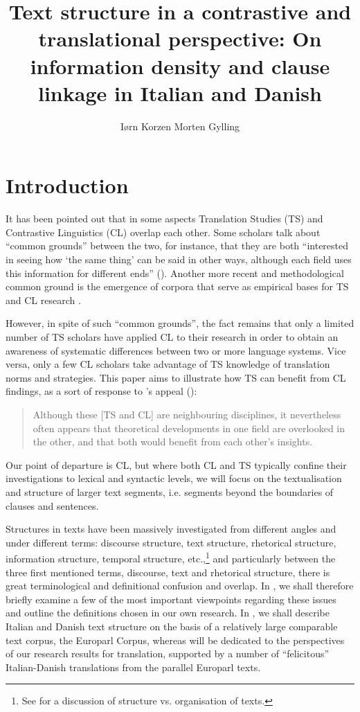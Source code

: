 \documentclass[output=paper]{LSP/langsci}
\author{Iørn Korzen\lastand 
Morten Gylling\affiliation{Copenhagen Business School} 
}
\title{Text structure in a contrastive and translational perspective: On information density and clause linkage in Italian and Danish}
\begin{document}
 

\section{Introduction}\label{sec:korzen:1}

It has been pointed out that in some aspects Translation Studies (TS) and Contrastive Linguistics (CL) overlap each other. Some scholars talk about ``common grounds'' between the two, for instance, that they are both ``interested in seeing how `the same thing' can be said in other ways, although each field uses this information for different ends'' (\citealt[39]{Chesterman1998}). Another more recent and methodological common ground is the emergence of corpora that serve as empirical bases for TS and CL research \citep{Granger2003}.

However, in spite of such ``common grounds'', the fact remains that only a limited number of TS scholars have applied CL to their research in order to obtain an awareness of systematic differences between two or more language systems. Vice versa, only a few CL scholars take advantage of TS knowledge of translation norms and strategies. This paper aims to illustrate how TS can benefit from CL findings, as a sort of response to \citeauthor{Chesterman1998}'s appeal (\citeyear[6]{Chesterman1998}):

\begin{quote} Although these [TS and CL] are neighbouring disciplines, it nevertheless often appears that theoretical developments in one field are overlooked in the other, and that both would benefit from each other's insights. 
\end{quote}

Our point of departure is CL, but where both CL and TS typically confine their investigations to lexical and syntactic levels, we will focus on the textualisation and structure of larger text segments, i.e. segments beyond the boundaries of clauses and sentences. 

Structures in texts have been massively investigated from different angles and under different terms: discourse structure, text structure, rhetorical structure, information structure, temporal structure, etc.,\footnote{See \citet{Hoey1991} for a discussion of structure vs. organisation of texts.} and particularly between the three first mentioned terms, discourse, text and rhetorical structure, there is great terminological and definitional confusion and overlap. In , we shall therefore briefly examine a few of the most important viewpoints regarding these issues and outline the definitions chosen in our own research. In , we shall describe Italian and Danish text structure on the basis of a relatively large comparable text corpus, the Europarl Corpus, whereas  will be dedicated to the perspectives of our research results for translation, supported by a number of ``felicitous'' Italian-Danish translations from the parallel Europarl texts.
\end{document}
